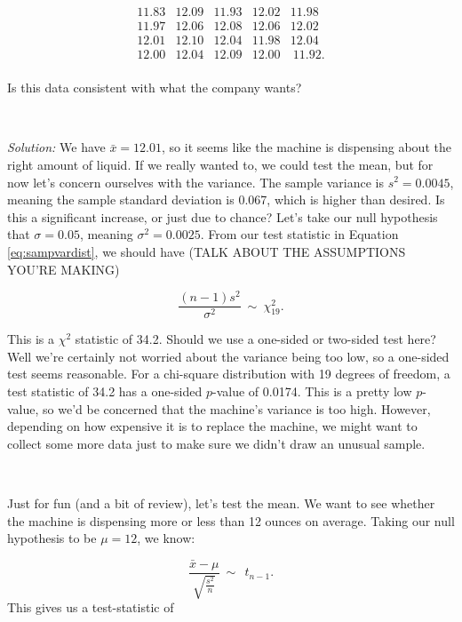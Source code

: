 \begin{equation*} \begin{array}{ccccc} 11.83 & 12.09 & 11.93 & 12.02 & 11.98 \\
11.97 & 12.06 & 12.08 & 12.06 & 12.02 \\
12.01 & 12.10 & 12.04 & 11.98 & 12.04 \\
12.00 & 12.04 & 12.09 & 12.00 & \ 11.92. \\ \end{array} \end{equation*}

\noindent Is this data consistent with what the company wants?


~

\emph{Solution:} We have $\bar{x} = 12.01$, so it seems like the machine is dispensing about the right amount of liquid. If we really wanted to, we could test the mean, but for now let's concern ourselves with the variance.  The sample variance is $s^2 = 0.0045$, meaning the sample standard deviation is 0.067, which is higher than desired.  Is this a significant increase, or just due to chance?  Let's take our null hypothesis that $\sigma = 0.05$, meaning $\sigma^2 = 0.0025$.  From our test statistic in Equation \ref{eq:sampvardist}, we should have (TALK ABOUT THE ASSUMPTIONS YOU'RE MAKING)

\begin{equation*}
\frac{(n-1)s^2}{\sigma^2} \ \sim \  \chi^2_{19}.
\end{equation*}

This is a $\chi^2$ statistic of 34.2.  Should we use a one-sided or two-sided test here?  Well we're certainly not worried about the variance being too low, so a one-sided test seems reasonable.  For a chi-square distribution with 19 degrees of freedom, a test statistic of 34.2 has a one-sided $p$-value of 0.0174.  This is a pretty low $p$-value, so we'd be concerned that the machine's variance is too high.  However, depending on how expensive it is to replace the machine, we might want to collect some more data just to make sure we didn't draw an unusual sample.

~

Just for fun (and a bit of review), let's test the mean.  We want to see whether the machine is dispensing more or less than 12 ounces on average.  Taking our null hypothesis to be $\mu = 12$, we know:

\begin{equation*}
\frac{\bar{x}-\mu}{\sqrt{\frac{s^2}{n}}}\ \sim \  \ t_{n-1}.
\end{equation*}
This gives us a test-statistic of

